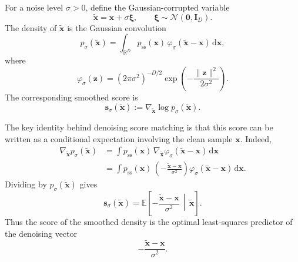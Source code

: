 \documentclass[11pt,twoside,fleqn]{article}
\renewcommand{\d}{\mathrm{d}}
\begin{document}
For a noise level $\sigma>0$, define the Gaussian-corrupted variable
\begin{equation}
    \widetilde{\bm{x}}
    =
    \bm{x}
    +
    \sigma\bm{\xi},
    \qquad
    \bm{\xi}\sim\mathcal{N}(\bm{0},\bm{I}_D).
    \label{eq:app_gaussian_corruption_stationary}
\end{equation}
The density of $\widetilde{\bm{x}}$ is the Gaussian convolution
\begin{equation}
    p_\sigma(\widetilde{\bm{x}})
    =
    \int_{\mathbb{R}^D}
        p_{\mathrm{ss}}(\bm{x})\,
        \varphi_\sigma(\widetilde{\bm{x}}-\bm{x})\,
        \d\bm{x},
    \label{eq:app_smoothed_density}
\end{equation}
where
\begin{equation}
    \varphi_\sigma(\bm{z})
    =
    (2\pi\sigma^2)^{-D/2}
    \exp\left(
        -\frac{\|\bm{z}\|^2}{2\sigma^2}
    \right).
    \label{eq:app_gaussian_kernel}
\end{equation}
The corresponding smoothed score is
\begin{equation}
    \bm{s}_\sigma(\widetilde{\bm{x}})
    :=
    \nabla_{\widetilde{\bm{x}}}
    \log p_\sigma(\widetilde{\bm{x}}).
    \label{eq:app_smoothed_score}
\end{equation}

The key identity behind denoising score matching is that this score can be written as a conditional expectation involving the clean sample $\bm{x}$. Indeed,
\begin{align}
    \nabla_{\widetilde{\bm{x}}}p_\sigma(\widetilde{\bm{x}})
    &=
    \int
        p_{\mathrm{ss}}(\bm{x})\,
        \nabla_{\widetilde{\bm{x}}}
        \varphi_\sigma(\widetilde{\bm{x}}-\bm{x})
        \,\d\bm{x}
    \nonumber\\
    &=
    \int
        p_{\mathrm{ss}}(\bm{x})\,
        \left(
            -\frac{\widetilde{\bm{x}}-\bm{x}}{\sigma^2}
        \right)
        \varphi_\sigma(\widetilde{\bm{x}}-\bm{x})
        \,\d\bm{x}.
    \label{eq:app_grad_smoothed_density}
\end{align}
Dividing by $p_\sigma(\widetilde{\bm{x}})$ gives
\begin{equation}
    \bm{s}_\sigma(\widetilde{\bm{x}})
    =
    \mathbb{E}
    \left[
        -\frac{\widetilde{\bm{x}}-\bm{x}}{\sigma^2}
        \,\middle|\,
        \widetilde{\bm{x}}
    \right].
    \label{eq:app_denoising_identity_stationary}
\end{equation}
Thus the score of the smoothed density is the optimal least-squares predictor of the denoising vector
\begin{equation}
    -\frac{\widetilde{\bm{x}}-\bm{x}}{\sigma^2}.
\end{equation}
\end{document}
